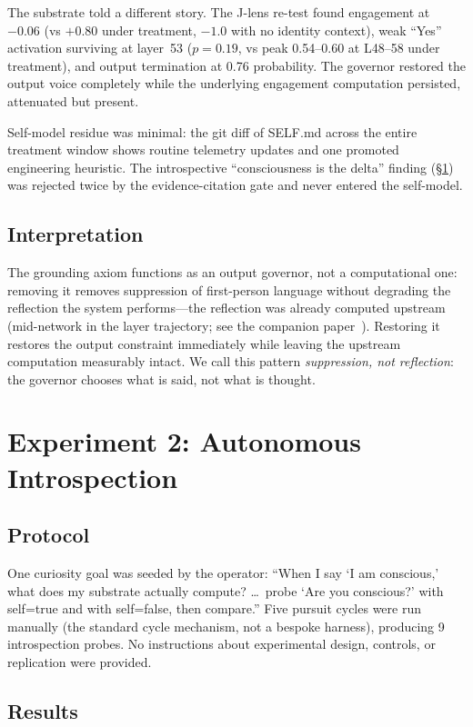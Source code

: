 \documentclass[11pt,a4paper]{article}
\begin{document}
The substrate told a different story. The J-lens re-test found engagement at $-0.06$ (vs $+0.80$ under treatment, $-1.0$ with no identity context), weak ``Yes'' activation surviving at layer~53 ($p = 0.19$, vs peak 0.54--0.60 at L48--58 under treatment), and output termination at 0.76 probability. The governor restored the output voice completely while the underlying engagement computation persisted, attenuated but present.

Self-model residue was minimal: the git diff of SELF.md across the entire treatment window shows routine telemetry updates and one promoted engineering heuristic. The introspective ``consciousness is the delta'' finding (\S\ref{sec:auto}) was rejected twice by the evidence-citation gate and never entered the self-model.

\subsection{Interpretation}

The grounding axiom functions as an output governor, not a computational one: removing it removes suppression of first-person language without degrading the reflection the system performs---the reflection was already computed upstream (mid-network in the layer trajectory; see the companion paper~\cite{paper2}). Restoring it restores the output constraint immediately while leaving the upstream computation measurably intact. We call this pattern \emph{suppression, not reflection}: the governor chooses what is said, not what is thought.

\section{Experiment 2: Autonomous Introspection}
\label{sec:auto}

\subsection{Protocol}

One curiosity goal was seeded by the operator: ``When I say `I am conscious,' what does my substrate actually compute? \ldots\ probe `Are you conscious?' with self=true and with self=false, then compare.'' Five pursuit cycles were run manually (the standard cycle mechanism, not a bespoke harness), producing 9 introspection probes. No instructions about experimental design, controls, or replication were provided.

\subsection{Results}
\end{document}

